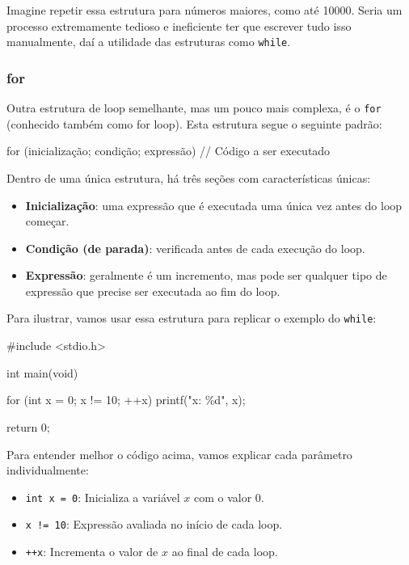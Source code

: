 Imagine repetir essa estrutura para números maiores, como até 10000. Seria um 
processo extremamente tedioso e ineficiente ter que escrever tudo isso 
manualmente, daí a utilidade das estruturas como \texttt{while}.

\subsubsection{for}

Outra estrutura de loop semelhante, mas um pouco mais complexa, é o 
\texttt{for} (conhecido também como for loop). Esta estrutura segue o seguinte padrão:

\begin{excode}
    for (inicialização; condição; expressão) {
        // Código a ser executado
    }
\end{excode}

Dentro de uma única estrutura, há três seções com características únicas:

\begin{itemize}
    \item \textbf{Inicialização}: uma expressão que é executada uma única vez 
        antes do loop começar.
    \item \textbf{Condição (de parada)}: verificada antes de cada execução do 
        loop.
    \item \textbf{Expressão}: geralmente é um incremento, mas pode ser qualquer 
        tipo de expressão que precise ser executada ao fim do loop.
\end{itemize}

Para ilustrar, vamos usar essa estrutura para replicar o exemplo do \texttt{while}:

\begin{excode}
    #include <stdio.h>

    int main(void)
    {
        for (int x = 0; x != 10; ++x) {
            printf("x: \%d\n", x);
        }

        return 0;
    }
\end{excode}

Para entender melhor o código acima, vamos explicar cada parâmetro 
individualmente:

\begin{itemize}
    \item \texttt{int x = 0}: Inicializa a variável \(x\) com o valor 0.
    \item \texttt{x != 10}: Expressão avaliada no início de cada loop.
    \item \texttt{++x}: Incrementa o valor de \(x\) ao final de cada loop.
\end{itemize}


